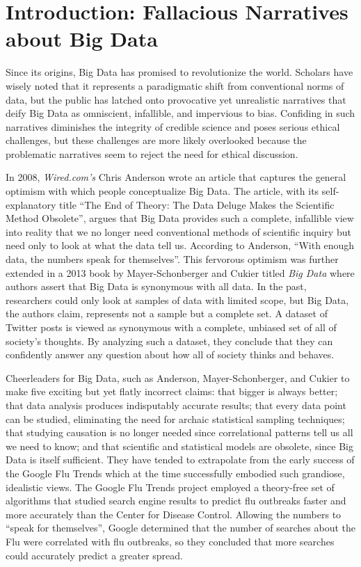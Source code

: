 \documentclass[sigconf]{acmart}
\begin{document}
\section{Introduction: Fallacious Narratives about Big Data}

Since its origins, Big Data has promised to revolutionize the world. Scholars have wisely noted that it represents a paradigmatic shift from conventional norms of data, but the public has latched onto provocative yet unrealistic narratives that deify Big Data as omniscient, infallible, and impervious to bias. Confiding in such narratives diminishes the integrity of credible science and poses serious ethical challenges, but these challenges are more likely overlooked because the problematic narratives seem to reject the need for ethical discussion. 

In 2008, {\em Wired.com's} Chris Anderson wrote an article that captures the general optimism with which people conceptualize Big Data. The article, with its self-explanatory title ``The End of Theory: The Data Deluge Makes the Scientific Method Obsolete'', argues that Big Data provides such a complete, infallible view into reality that we no longer need conventional methods of scientific inquiry but need only to look at what the data tell us. According to Anderson, ``With enough data, the numbers speak for themselves''\cite{Anderson2008}. This fervorous optimism was further extended in a 2013 book by Mayer-Schonberger and Cukier titled {\em Big Data} where authors assert that Big Data is synonymous with all data. In the past, researchers could only look at samples of data with limited scope, but Big Data, the authors claim, represents not a sample but a complete set\cite{Lagoze2014}. A dataset of Twitter posts is viewed as synonymous with a complete, unbiased set of all of society's thoughts. By analyzing such a dataset, they conclude that they can confidently answer any question about how all of society thinks and behaves\cite{Harford2014}.

Cheerleaders for Big Data, such as Anderson, Mayer-Schonberger, and Cukier to make five exciting but yet flatly incorrect claims: that bigger is always better; that data analysis produces indisputably accurate results; that every data point can be studied, eliminating the need for archaic statistical sampling techniques; that studying causation is no longer needed since correlational patterns tell us all we need to know; and that scientific and statistical models are obsolete, since Big Data is itself sufficient. They have tended to extrapolate from the early success of the Google Flu Trends which at the time successfully embodied such grandiose, idealistic views. The Google Flu Trends project employed a theory-free set of algorithms that studied search engine results to predict flu outbreaks faster and more accurately than the Center for Disease Control. Allowing the numbers to ``speak for themselves'', Google determined that the number of searches about the Flu were correlated with flu outbreaks, so they concluded that more searches could accurately predict a greater spread\cite{Harford2014}. 
\end{document}
